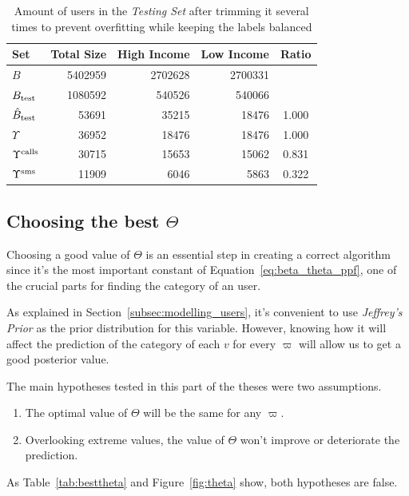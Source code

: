 \begin{table}
\centering
\begin{tabular}{l r r r c}
\toprule
Set & Total Size & High Income & Low Income & Ratio \\
\midrule
$B$ & \num{5402959} & \num{2702628} & \num{2700331} & \NA{} \\
$B_{\operatorname{test}}$ & \num{1080592} & \num{540526} & \num{540066} & \NA{} \\
$\hat{B}_{\operatorname{test}}$ & \num{53691} & \num{35215} & \num{18476} & \num{1.000} \\
$\Upsilon$ & \num{36952} & \num{18476} & \num{18476} & 1.000 \\
$\Upsilon^{\operatorname{calls}}$ & \num{30715} & \num{15653} & \num{15062} & 0.831 \\
$\Upsilon^{\operatorname{sms}}$ & \num{11909} & \num{6046} & \num{5863} & 0.322 \\
\bottomrule
\end{tabular}
\caption{Amount of users in the \emph{Testing Set} after trimming it several times to prevent overfitting while keeping the labels balanced}
\label{tab:partition_numbers}
\end{table}

\subsection{Choosing the best $\Theta$}

Choosing a good value of $\Theta$ is an essential step in creating a correct algorithm since it's the most important constant of Equation~\ref{eq:beta_theta_ppf}, one of the crucial parts for finding the category of an user.

As explained in Section~\ref{subsec:modelling_users}, it's convenient to use \emph{Jeffrey's Prior} as the prior distribution for this variable. However, knowing how it will affect the prediction of the category of each $v$ for every $\varpi$ will allow us to get a good posterior value.

The main hypotheses tested in this part of the theses were two assumptions.

\begin{enumerate}
	\item The optimal value of $\Theta$ will be the same for any $\varpi$.
	\item Overlooking extreme values, the value of $\Theta$ won't improve or deteriorate the prediction.
\end{enumerate}

As Table~\ref{tab:besttheta} and Figure~\ref{fig:theta} show, both hypotheses are false.

